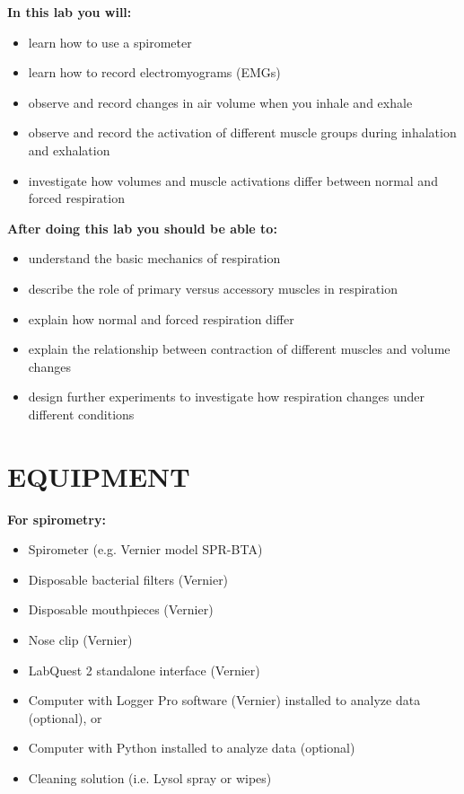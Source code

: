 \documentclass[12pt]{article}
\begin{document}
\vspace{0.3cm}

\textbf{In this lab you will:}
\begin{itemize}
\item learn how to use a spirometer 
\item learn how to record electromyograms (EMGs)
\item observe and record changes in air volume when you inhale and exhale
\item observe and record the activation of different muscle groups during inhalation and exhalation
\item investigate how volumes and muscle activations differ between normal and forced respiration
\end{itemize}

\vspace{0.3cm}
 
\textbf{After doing this lab you should be able to:}
\begin{itemize}
\item understand the basic mechanics of respiration
\item describe the role of primary versus accessory muscles in respiration
\item explain how normal and forced respiration differ
\item explain the relationship between contraction of different muscles and volume changes
\item design further experiments to investigate how respiration changes under different conditions
\end{itemize}

\section*{EQUIPMENT}

\textbf{For spirometry:}
 \begin{itemize}
	\item Spirometer (e.g. Vernier model SPR-BTA)
   	\item Disposable bacterial filters (Vernier)	
	\item Disposable mouthpieces (Vernier)
    \item Nose clip (Vernier)
	\item LabQuest 2 standalone interface (Vernier)
    \item Computer with Logger Pro software (Vernier) installed to analyze data (optional), or
    \item Computer with Python installed to analyze data (optional)
    \item Cleaning solution (i.e. Lysol spray or wipes)
\end{itemize}
\end{document}
